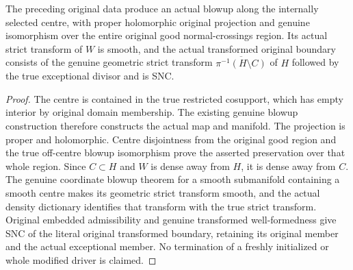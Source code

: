 \begin{theorem}
\label{hir:sharp-single-boundary-actual-modified-blowup}
\leanok
The preceding original data produce an actual blowup along the internally
selected centre, with proper holomorphic original projection and genuine
isomorphism over the entire original good normal-crossings region. Its
actual strict transform of $W$ is smooth, and the actual transformed
original boundary consists of the genuine geometric strict transform
$\overline{\pi^{-1}(H\setminus C)}$ of $H$ followed
by the true exceptional divisor and is SNC.
\end{theorem}
\begin{proof}
The centre is contained in the true restricted cosupport, which has
empty interior by original domain membership. The existing genuine
blowup construction therefore constructs the actual map and manifold.
The projection is proper and holomorphic. Centre disjointness from the
original good region and the true off-centre blowup isomorphism prove
the asserted preservation over that whole region. Since $C\subset H$
and $W$ is dense away from $H$, it is dense away from $C$. The genuine
coordinate blowup theorem for a smooth submanifold containing a smooth
centre makes its geometric strict transform smooth, and the actual
density dictionary identifies that transform with the true strict
transform. Original embedded admissibility and genuine transformed
well-formedness give SNC of the literal original transformed boundary,
retaining its original member and the actual exceptional member.
No termination of a freshly initialized or whole modified driver is
claimed.
\end{proof}
